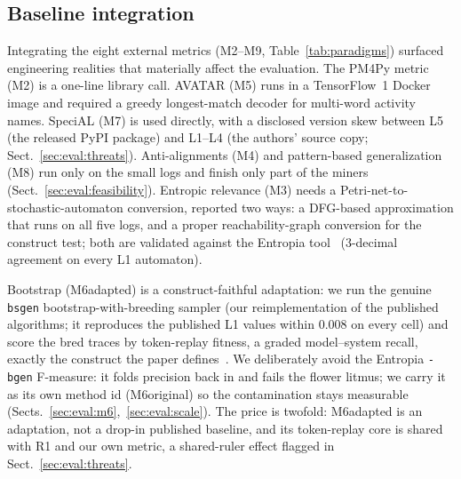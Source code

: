\documentclass[runningheads]{llncs}
\newcommand{\chg}[1]{#1}
\begin{document}
\subsection{Baseline integration}
\label{sec:impl:baselines}
Integrating the eight external metrics (M2--M9, Table~\ref{tab:paradigms}) surfaced engineering realities that materially affect the evaluation. The PM4Py metric (M2) is a one-line library call. AVATAR (M5) runs in a TensorFlow~1 Docker image and required a greedy longest-match decoder for multi-word activity names. SpeciAL (M7) is used directly, with a disclosed version skew between L5 (the released PyPI package) and L1--L4 (the authors' source copy; Sect.~\ref{sec:eval:threats}). \chg{Anti-alignments (M4) and pattern-based generalization (M8) run only on the small logs and finish only part of the miners} (Sect.~\ref{sec:eval:feasibility}). Entropic relevance (M3) needs a Petri-net-to-stochastic-automaton conversion, reported two ways: a DFG-based approximation that runs on all five logs, and a proper reachability-graph conversion for the construct test; both are validated against the Entropia tool~\cite{polyvyanyy2020entropia} ($3$-decimal agreement on every L1 automaton).

Bootstrap (M6adapted) is a construct-faithful adaptation: we run the genuine \texttt{bsgen} bootstrap-with-breeding sampler (our reimplementation of the published algorithms; it reproduces the published L1 values within $0.008$ on every cell) and score the bred traces by token-replay fitness, a graded model--system recall, exactly the construct the paper defines~\cite{polyvyanyy2022bootstrap}. We deliberately avoid the Entropia \texttt{-bgen} F-measure: it folds precision back in and fails the flower litmus; we carry it as its own method id (M6original) so the contamination stays measurable (Sects.~\ref{sec:eval:m6},~\ref{sec:eval:scale}). The price is twofold: M6adapted is an adaptation, not a drop-in published baseline, and its token-replay core is shared with R1 and our own metric, a shared-ruler effect flagged in Sect.~\ref{sec:eval:threats}.
\end{document}

